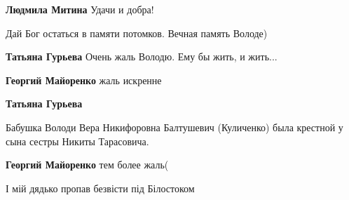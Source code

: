 \begin{itemize}
\textbf{Людмила Митина} Удачи и добра!

Дай Бог остаться в памяти потомков. Вечная память Володе)

\begin{itemize} %
\textbf{Татьяна Гурьева} Очень жаль Володю. Ему бы жить, и жить...

\textbf{Георгий Майоренко} жаль искренне

\textbf{Татьяна Гурьева} 

Бабушка Володи Вера Никифоровна Балтушевич (Куличенко) была крестной у сына
сестры Никиты Тарасовича.

\textbf{Георгий Майоренко} тем более жаль(
\end{itemize} %

І мій дядько пропав безвісти під Білостоком

\end{itemize} %

